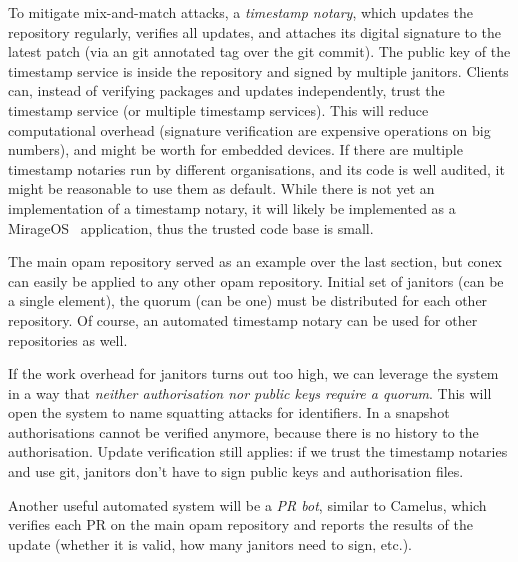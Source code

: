 \documentclass[nocopyrightspace]{sigplanconf}
\newcommand{\TODO}[1]{\textbf{[TODO: #1]}}
\begin{document}

To mitigate mix-and-match attacks, a \emph{timestamp notary}, which updates the repository regularly, verifies all updates, and attaches its digital signature to the latest patch (via an git annotated tag over the git commit).
The public key of the timestamp service is inside the repository and signed by multiple janitors.
Clients can, instead of verifying packages and updates independently, trust the timestamp service (or multiple timestamp services).
This will reduce computational overhead (signature verification are expensive operations on big numbers), and might be worth for embedded devices.
If there are multiple timestamp notaries run by different organisations, and its code is well audited, it might be reasonable to use them as default.
While there is not yet an implementation of a timestamp notary, it will likely be implemented as a MirageOS~\cite{mirage,nqsb-tls} application, thus the trusted code base is small.

The main opam repository served as an example over the last section, but conex can easily be applied to any other opam repository.
Initial set of janitors (can be a single element), the quorum (can be one) must be distributed for each other repository.
Of course, an automated timestamp notary can be used for other repositories as well.

If the work overhead for janitors turns out too high, we can leverage the system in a way that \emph{neither authorisation nor public keys require a quorum}.
This will open the system to name squatting attacks for identifiers.
In a snapshot authorisations cannot be verified anymore, because there is no history to the authorisation.
Update verification still applies: if we trust the timestamp notaries and use git, janitors don't have to sign public keys and authorisation files.


Another useful automated system will be a \emph{PR bot}, similar to Camelus, which verifies each PR on the main opam repository and reports the results of the update (whether it is valid, how many janitors need to sign, etc.).
\end{document}
